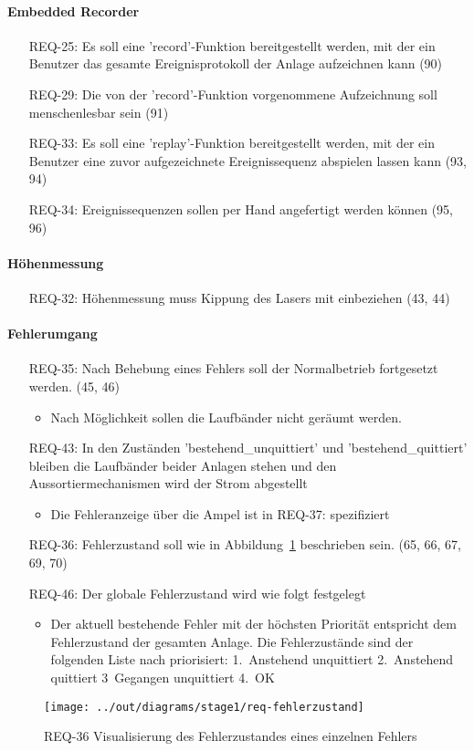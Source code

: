 \paragraph{Embedded Recorder}
\begin{itemize}
    \item[REQ-25:] Es soll eine 'record'-Funktion bereitgestellt werden, mit der ein Benutzer das gesamte
    Ereignisprotokoll der Anlage aufzeichnen kann (90)
    \item[REQ-29:] Die von der 'record'-Funktion vorgenommene Aufzeichnung soll menschenlesbar sein (91)
    \item[REQ-33:] Es soll eine 'replay'-Funktion bereitgestellt werden, mit der ein
    Benutzer eine zuvor aufgezeichnete Ereignissequenz abspielen lassen kann (93, 94)
    \item[REQ-34:] Ereignissequenzen sollen per Hand angefertigt werden können (95, 96)
\end{itemize}

\paragraph{Höhenmessung}
\begin{itemize}
    \item[REQ-32:] Höhenmessung muss Kippung des Lasers mit einbeziehen (43, 44)
\end{itemize}

\paragraph{Fehlerumgang}
\begin{itemize}
    \item[REQ-35:] Nach Behebung eines Fehlers soll der Normalbetrieb fortgesetzt werden. (45, 46)
    \begin{itemize}
        \item Nach Möglichkeit sollen die Laufbänder nicht geräumt werden.
    \end{itemize}
    \item[REQ-43:] In den Zuständen 'bestehend\_unquittiert' und 'bestehend\_quittiert' bleiben die
    Laufbänder beider Anlagen stehen und den Aussortiermechanismen wird der Strom abgestellt
    \begin{itemize}
        \item Die Fehleranzeige über die Ampel ist in REQ-37: spezifiziert
    \end{itemize}
    \item[REQ-36:] Fehlerzustand soll wie in Abbildung~\ref{fig:stm-fehlerzustand} beschrieben sein. (65, 66, 67, 69, 70)
    \item[REQ-46:] Der globale Fehlerzustand wird wie folgt festgelegt
    \begin{itemize}
        \item Der aktuell bestehende Fehler mit der höchsten Priorität entspricht dem Fehlerzustand der gesamten Anlage.
        Die Fehlerzustände sind der folgenden Liste nach priorisiert: 1.\ Anstehend unquittiert
        2.\ Anstehend quittiert 3\ Gegangen unquittiert 4.\ OK
    \end{itemize}
\end{itemize}

\begin{figure}[h]
    \centering
    \texttt{[image: ../out/diagrams/stage1/req-fehlerzustand]}
    \caption{REQ-36 Visualisierung des Fehlerzustandes eines einzelnen Fehlers}
    \label{fig:stm-fehlerzustand}
\end{figure}
